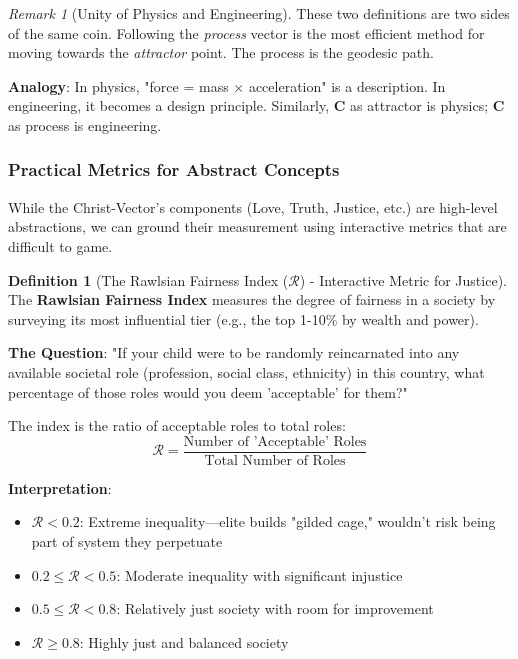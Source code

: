\documentclass[11pt,a4paper]{article}
\theoremstyle{definition}
\newtheorem{definition}{Definition}[section]
\theoremstyle{remark}
\newtheorem{remark}{Remark}[section]
\begin{document}
\begin{small}
\begin{remark}[Unity of Physics and Engineering]
These two definitions are two sides of the same coin. Following the \textit{process} vector is the most efficient method for moving towards the \textit{attractor} point. The process is the geodesic path.

\textbf{Analogy}: In physics, "force = mass × acceleration" is a description. In engineering, it becomes a design principle. Similarly, \(\mathbf{C}\) as attractor is physics; \(\mathbf{C}\) as process is engineering.
\end{remark}

\subsubsection{Practical Metrics for Abstract Concepts}

While the Christ-Vector's components (Love, Truth, Justice, etc.) are high-level abstractions, we can ground their measurement using interactive metrics that are difficult to game.

\begin{definition}[The Rawlsian Fairness Index (\(\mathcal{R}\)) - Interactive Metric for Justice]
The \textbf{Rawlsian Fairness Index} measures the degree of fairness in a society by surveying its most influential tier (e.g., the top 1-10\% by wealth and power). 

\textbf{The Question}: "If your child were to be randomly reincarnated into any available societal role (profession, social class, ethnicity) in this country, what percentage of those roles would you deem 'acceptable' for them?"

The index is the ratio of acceptable roles to total roles:
\begin{equation}
\mathcal{R} = \frac{\text{Number of 'Acceptable' Roles}}{\text{Total Number of Roles}}
\end{equation}

\textbf{Interpretation}:
\begin{itemize}
    \item \(\mathcal{R} < 0.2\): Extreme inequality—elite builds "gilded cage," wouldn't risk being part of system they perpetuate
    \item \(0.2 \leq \mathcal{R} < 0.5\): Moderate inequality with significant injustice
    \item \(0.5 \leq \mathcal{R} < 0.8\): Relatively just society with room for improvement
    \item \(\mathcal{R} \geq 0.8\): Highly just and balanced society
\end{itemize}


\end{definition}
\end{small}
\end{document}
